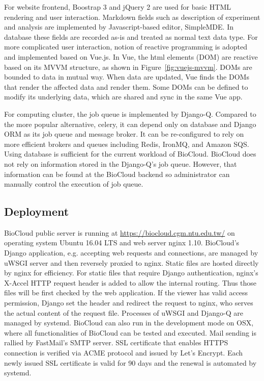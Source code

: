 For website frontend, Boostrap 3 and jQuery 2 are used for basic HTML
rendering and user interaction. Markdown fields such as description of
experiment and analysis are implemented by Javascript-based editor, SimpleMDE.
In database these fields are recorded as-is and treated as normal text
data type. For more complicated user interaction, notion of reactive
programming is adopted and implemented based on Vue.js. In Vue, the html
elements (DOM) are reactive based on its MVVM structure, as shown in
Figure~\ref{fig:vuejs-mvvm}. DOMs are bounded to data in mutual way. When data
are updated, Vue finds the DOMs that render the affected data and render
them. Some DOMs can be defined to modify its underlying data, which are shared
and sync in the same Vue app.



For computing cluster, the job queue is implemented by Django-Q. Compared to
the more popular alternative, celery, it can depend only on database and Django
ORM as its job queue and message broker. It can be re-configured to rely on
more efficient brokers and queues including Redis, IronMQ, and Amazon SQS.
Using database is sufficient for the current workload of BioCloud. BioCloud
does not rely on information stored in the Django-Q's job queue. However, that
information can be found at the BioCloud backend so administrator can manually
control the execution of job queue.


\subsection{Deployment}


BioCloud public server is running at \url{https://biocloud.cgm.ntu.edu.tw/} on
operating system Ubuntu 16.04 LTS and web server nginx 1.10. BioCloud's Django
application, e.g. accepting web requests and connections, are managed by uWSGI
server and then reversely proxied to nginx. Static files are hosted directly by
nginx for efficiency. For static files that require Django authentication,
nginx's X-Accel HTTP request header is added to allow the internal routing.
Thus those files will be first checked by the web application. If the viewer
has valid access permission, Django set the header and redirect the request to
nginx, who serves the actual content of the request file. Processes of uWSGI
and Django-Q are managed by systemd. BioCloud can also run in the development
mode on OSX, where all functionalities of BioCloud can be tested and executed.
Mail sending is rallied by FastMail's SMTP server. SSL certificate that enables
HTTPS connection is verified via ACME protocol and issued by Let's Encrypt.
Each newly issued SSL certificate is valid for 90 days and the renewal is
automated by systemd.


